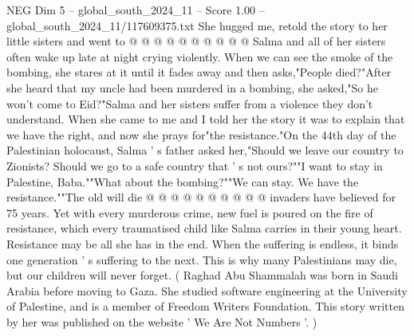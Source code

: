 \begin{textsample}{NEG Dim 5 – global\_south\_2024\_11 – Score 1.00 – global\_south\_2024\_11/117609375.txt}
She hugged me, retold the story to her little sisters and went to @ @ @ @ @ @ @ @ @ @ Salma and all of her sisters often wake up late at night crying violently.
When we can see the smoke of the bombing, she stares at it until it fades away and then asks,"People died?"After she heard that my uncle had been murdered in a bombing, she asked,"So he won't come to Eid?"Salma and her sisters suffer from a violence they don't understand.
When she came to me and I told her the story it was to explain that we have the right, and now she prays for"the resistance."On the 44th day of the Palestinian holocaust, Salma ' s father asked her,"Should we leave our country to Zionists?
Should we go to a safe country that ' s not ours?""I want to stay in Palestine, Baba.""What about the bombing?""We can stay.
We have the resistance.""The old will die @ @ @ @ @ @ @ @ @ @ invaders have believed for 75 years.
Yet with every murderous crime, new fuel is poured on the fire of resistance, which every traumatised child like Salma carries in their young heart.
Resistance may be all she has in the end.
When the suffering is endless, it binds one generation ' s suffering to the next.
This is why many Palestinians may die, but our children will never forget. ( Raghad Abu Shammalah was born in Saudi Arabia before moving to Gaza.
She studied software engineering at the University of Palestine, and is a member of Freedom Writers Foundation.
This story written by her was published on the website ' We Are Not Numbers '. )

\end{textsample}
